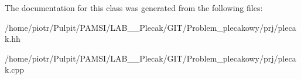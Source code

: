\-The documentation for this class was generated from the following files\-:\begin{DoxyCompactItemize}
\item 
/home/piotr/\-Pulpit/\-P\-A\-M\-S\-I/\-L\-A\-B\-\_\-\_\-\-Plecak/\-G\-I\-T/\-Problem\-\_\-plecakowy/prj/plecak.\-hh\item 
/home/piotr/\-Pulpit/\-P\-A\-M\-S\-I/\-L\-A\-B\-\_\-\_\-\-Plecak/\-G\-I\-T/\-Problem\-\_\-plecakowy/prj/plecak.\-cpp\end{DoxyCompactItemize}
